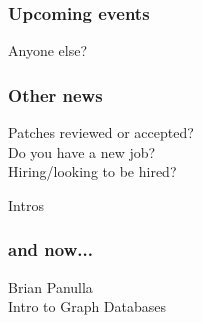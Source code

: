 \documentclass{beamer}
\begin{document}
\frame
{
  \frametitle{Upcoming events}
  \begin{center}
Anyone else?
  \end{center}
}

\frame
{
  \frametitle{Other news}
  \begin{center}
Patches reviewed or accepted?\\
Do you have a new job?\\
Hiring/looking to be hired?
  \end{center}
}

\frame
{
  \begin{center}
  {\huge Intros}
  \end{center}
}

\frame
{
  \frametitle{and now...}
  \begin{center}
{\huge Brian Panulla}\\
Intro to Graph Databases
  \end{center}
}
\end{document}
